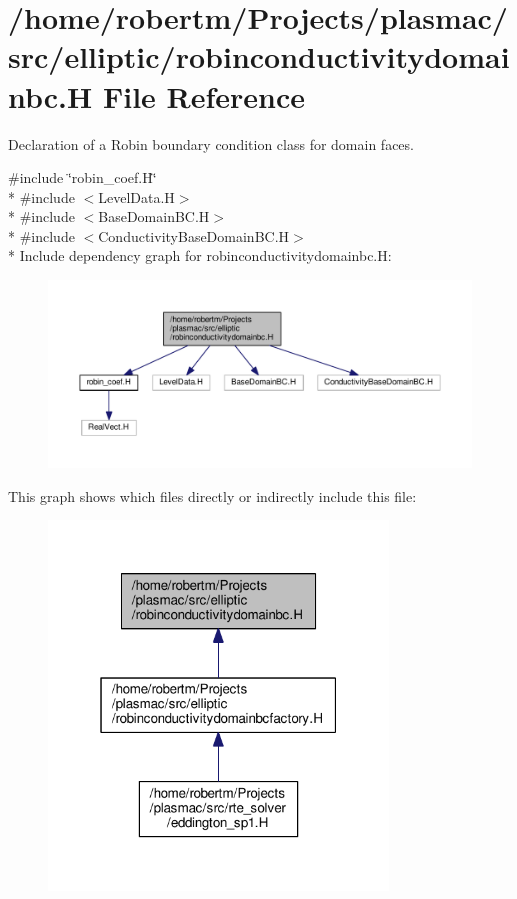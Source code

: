 \hypertarget{robinconductivitydomainbc_8H}{}\section{/home/robertm/\+Projects/plasmac/src/elliptic/robinconductivitydomainbc.H File Reference}
\label{robinconductivitydomainbc_8H}


Declaration of a Robin boundary condition class for domain faces.  


{\ttfamily \#include \char`\"{}robin\+\_\+coef.\+H\char`\"{}}\\*
{\ttfamily \#include $<$Level\+Data.\+H$>$}\\*
{\ttfamily \#include $<$Base\+Domain\+B\+C.\+H$>$}\\*
{\ttfamily \#include $<$Conductivity\+Base\+Domain\+B\+C.\+H$>$}\\*
Include dependency graph for robinconductivitydomainbc.\+H\+:\nopagebreak
\begin{figure}[H]
\begin{center}
\leavevmode
\includegraphics[width=350pt]{robinconductivitydomainbc_8H__incl}
\end{center}
\end{figure}
This graph shows which files directly or indirectly include this file\+:\nopagebreak
\begin{figure}[H]
\begin{center}
\leavevmode
\includegraphics[width=256pt]{robinconductivitydomainbc_8H__dep__incl}
\end{center}
\end{figure}

